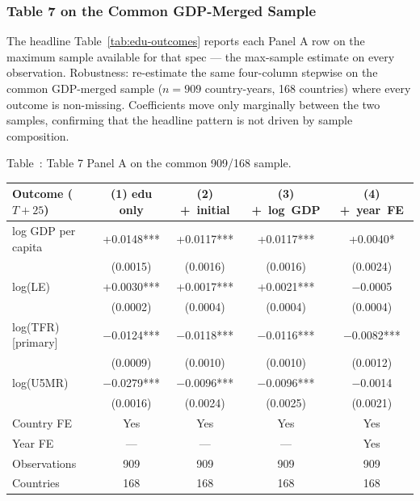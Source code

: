 \documentclass[12pt,letterpaper]{article}
\begin{document}
{\subsubsection{Table 7 on the Common GDP-Merged Sample}\label{appendix-table7-common}

The headline Table~\ref{tab:edu-outcomes} reports each Panel A row on the
maximum sample available for that spec --- the max-sample estimate on every
observation. Robustness: re-estimate the same
four-column stepwise on the common GDP-merged sample
($n=909$ country-years, 168 countries) where every outcome is
non-missing. Coefficients move only marginally between the two
samples, confirming that the headline pattern is not driven by
sample composition.

\label{tab:7-common-927}Table~\thetable: Table 7 Panel A on the common 909/168 sample.

{\setlength{\tabcolsep}{4pt}
\begin{longtable}[]{@{}lcccc@{}}
\toprule
Outcome ($T{+}25$)   & (1) edu only & (2) +~initial & (3) +~log~GDP & (4) +~year~FE \\
\midrule
\endhead
log GDP per capita     & +0.0148*** & +0.0117*** & +0.0117*** & +0.0040*\hphantom{*} \\
                       & (0.0015)   & (0.0016)   & (0.0016)   & (0.0024)              \\
log(LE)                & +0.0030*** & +0.0017*** & +0.0021*** & $-$0.0005\hphantom{***} \\
                       & (0.0002)   & (0.0004)   & (0.0004)   & (0.0004)              \\
log(TFR) [primary]    & $-$0.0124*** & $-$0.0118*** & $-$0.0116*** & $-$0.0082*** \\
                       & (0.0009)   & (0.0010)   & (0.0010)   & (0.0012)              \\
log(U5MR)              & $-$0.0279*** & $-$0.0096*** & $-$0.0096*** & $-$0.0014\hphantom{***} \\
                       & (0.0016)   & (0.0024)   & (0.0025)   & (0.0021)              \\
\midrule
Country FE             & Yes   & Yes   & Yes   & Yes \\
Year FE                & ---   & ---   & ---   & Yes \\
Observations           & 909   & 909   & 909   & 909 \\
Countries              & 168   & 168   & 168   & 168 \\
\bottomrule
\end{longtable}}

}
\end{document}
